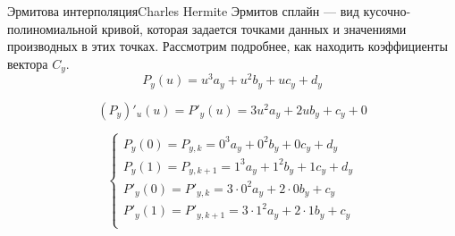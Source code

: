\documentclass{beamer}
\begin{document}
	\begin{frame}{Эрмитова интерполяция}{Charles Hermite}
		Эрмитов сплайн --- вид кусочно-полиномиальной кривой, которая задается точками данных и значениями производных в этих точках.
		Рассмотрим подробнее, как находить коэффициенты вектора $C_y$.
		\[
			P_y(u) = u^3 a_y + u^2 b_y + u c_y + d_y
		\]

		\[
			(P_y)'_u(u) = P'_y(u) = 3 u^2 a_y + 2 u b_y + c_y + 0
		\]
		
		\[
			\begin{cases}
				P_y(0) = P_{y,k} = 0^3 a_y + 0^2 b_y + 0 c_y + d_y \\
				P_y(1) = P_{y,k+1} = 1^3 a_y + 1^2 b_y + 1 c_y + d_y \\
				P'_y(0) = P'_{y,k} = 3 \cdot 0^2 a_y + 2 \cdot 0 b_y + c_y \\
				P'_y(1) = P'_{y,k+1} = 3 \cdot 1^2 a_y + 2 \cdot 1 b_y + c_y \\
			\end{cases}
		\]



		\note{

		\[
			\begin{bmatrix}
				P_{y,k} \\
				P_{y,k+1} \\
				P'_{y,k} \\
				P'_{y,k+1} \\
			\end{bmatrix}
			=
			\begin{bmatrix}
				0 & 0 & 0 & 1 \\
				1 & 1 & 1 & 1 \\
				0 & 0 & 1 & 0 \\
				3 & 2 & 1 & 0 \\
			\end{bmatrix}
			\begin{bmatrix}
				a_y \\
				b_y \\
				c_y \\
				d_y \\
			\end{bmatrix}
		\]

		\[
			\begin{bmatrix}
				a_y \\
				b_y \\
				c_y \\
				d_y \\
			\end{bmatrix}
			=
			\begin{bmatrix}
				0 & 0 & 0 & 1 \\
				1 & 1 & 1 & 1 \\
				0 & 0 & 1 & 0 \\
				3 & 2 & 1 & 0 \\
			\end{bmatrix}^{-1}
			\begin{bmatrix}
				P_{y,k} \\
				P_{y,k+1} \\
				P'_{y,k} \\
				P'_{y,k+1} \\
			\end{bmatrix}
		\]

}
\end{frame}
\end{document}

